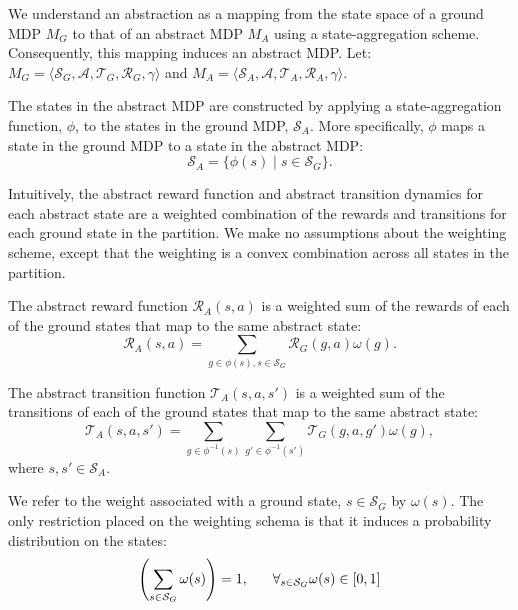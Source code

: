 We understand an abstraction as a mapping from the state space of a ground MDP $M_G$ to that of an abstract MDP $M_A$ using a state-aggregation scheme. Consequently, this mapping induces an abstract MDP. Let:$M_G = \langle \mathcal{S}_G, \mathcal{A}, \mathcal{T}_G, \mathcal{R}_G, \gamma \rangle$ and $M_A = \langle \mathcal{S}_A, \mathcal{A}, \mathcal{T}_A, \mathcal{R}_A, \gamma \rangle$.

The states in the abstract \ac{MDP} are constructed by applying a state-aggregation function, $\phi$, to the states in the ground \ac{MDP}, $\mathcal{S}_A$. More specifically, $\phi$ maps a state in the ground \ac{MDP} to a state in the abstract \ac{MDP}:
\begin{equation}
\mathcal{S}_A = \{ \phi(s) \mid s \in \mathcal{S}_G\}.
\end{equation}

Intuitively, the abstract reward function and abstract transition dynamics for each abstract state are a weighted combination of the rewards and transitions for each ground state in the partition. We make no assumptions about the weighting scheme, except that the weighting is a convex combination across all states in the partition.

The abstract reward function $\mathcal{R}_A(s,a)$ is a weighted sum of the rewards of each of the ground states that map to the same abstract state:
\begin{equation}
\mathcal{R}_A(s,a) = \sum_{g \in \phi(s), s \in \mathcal{S}_G} \mathcal{R}_G(g,a) \omega(g) .
\end{equation}

The abstract transition function $\mathcal{T}_A(s,a,s')$ is a weighted sum of the transitions of each of the ground states that map to the same abstract state:
\begin{equation}
\mathcal{T}_A(s,a,s') = \sum_{g \in \phi^{-1}(s)} \sum_{g' \in \phi^{-1}(s')} \mathcal{T}_G(g,a,g') \omega(g),
\end{equation}
\noindent where $
s, s' \in \mathcal{S}_A
$.

We refer to the weight associated with a ground state, $s \in \mathcal{S}_G$ by $\omega(s)$. The only restriction placed on the weighting schema is that it induces a probability distribution on the states:
\begin{equation}
\left(\sum_{s \in \mathcal{S}_G} \omega(s)\right) = 1,\hspace{6mm} \forall_{s \in \mathcal{S}_G} \omega(s) \in [0,1]
\end{equation}

